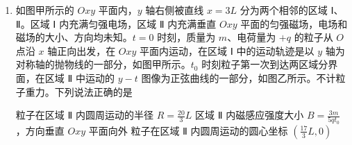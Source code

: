 \documentclass[\gkver]{gaokaozhenti}
\begin{document}
\begin{enumerate}
{$F_{\text{电}}$ 与 $F_{\text{电}}'$ 是一对相互作用力，可得 $m_{\text{甲}} > m_{\text{乙}}$

A 错误；

B．根据点电荷场强公式 $E = \frac{kQ}{r^{2}}$，由场强叠加知识，可知 C 到 D 之间的圆弧上各点场强方向都向右下方，若有一正试探电荷从 C 运动到 D 的过程中，电场力做正功，电势能减小，故可判断 C 点电势高于 D 点电势，B 正确；

C．两带电小球连线上的电场分布可以等效成一对等量异种点电荷的电场和在 A 点带电量为 $3q$ 的正点电荷的电场相互叠加的电场。在等量异种点电荷的电场中 E、F 两点电场强度大小相等，方向相同。但是 A 点带电量为 $3q$ 的正点电荷在 E、F 两点的电场强度不同。E、F 两点电场强度大小不同，C 错误；

D．电势是标量，OD 与 AB 线段的交点距离两带电小球最近，所以该点电势最大，那么沿直线从 O 点到 D 点，电势先升高后降低，D 正确。

故选 BD。
}

\item
如图甲所示的 $Oxy$ 平面内，$y$ 轴右侧被直线 $x = 3L$ 分为两个相邻的区域 Ⅰ、Ⅱ。区域 Ⅰ 内充满匀强电场，区域 Ⅱ 内充满垂直 $Oxy$ 平面的匀强磁场，电场和磁场的大小、方向均未知。$t = 0$ 时刻，质量为 $m$、电荷量为 $+ q$ 的粒子从 $O$ 点沿 $x$ 轴正向出发，在 $Oxy$ 平面内运动，在区域 Ⅰ 中的运动轨迹是以 $y$ 轴为对称轴的抛物线的一部分，如图甲所示。$t_{0}$ 时刻粒子第一次到达两区域分界面，在区域 Ⅱ 中运动的 $y-t$ 图像为正弦曲线的一部分，如图乙所示。不计粒子重力。下列说法正确的是


{粒子在区域 Ⅱ 内圆周运动的半径 $R = \frac{20}{3}L$}
{区域 Ⅱ 内磁感应强度大小 $B = \frac{3m}{5qt_{0}}$，方向垂直 $Oxy$ 平面向外}
{粒子在区域 Ⅱ 内圆周运动的圆心坐标 $\left(\frac{17}{3}L, 0\right)$}

\end{enumerate}
\end{document}
